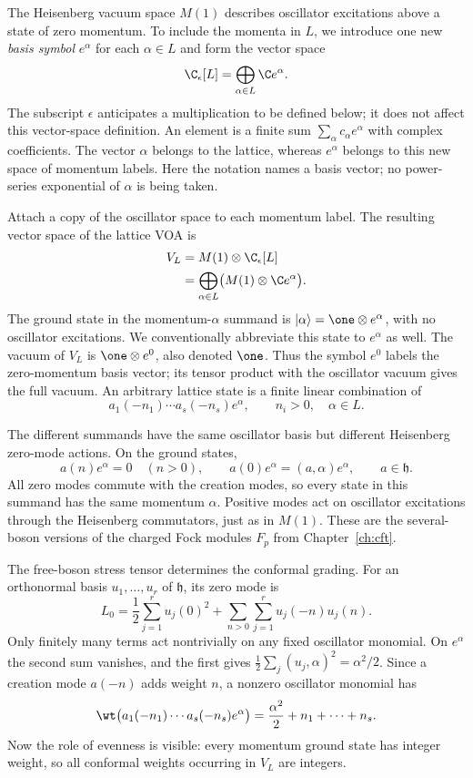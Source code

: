 The Heisenberg vacuum space $M(1)$ describes oscillator excitations
above a state of zero momentum. To include the momenta in $L$, we
introduce one new \emph{basis symbol} $e^\alpha$ for each
$\alpha\in L$ and form the vector space
\[
 \C_\epsilon[L]=\bigoplus_{\alpha\in L}\C e^\alpha.
\]
The subscript $\epsilon$ anticipates a multiplication to be defined
below; it does not affect this vector-space definition. An element
is a finite sum $\sum_\alpha c_\alpha e^\alpha$ with complex
coefficients. The vector $\alpha$ belongs to the lattice, whereas
$e^\alpha$ belongs to this new space of momentum labels. Here the
notation names a basis vector; no power-series exponential of
$\alpha$ is being taken.

Attach a copy of the oscillator space to each momentum label. The
resulting vector space of the lattice VOA is
\begin{equation}
 \begin{split}
 V_L&=M(1)\otimes\C_\epsilon[L]\\
    &=\bigoplus_{\alpha\in L}\bigl(M(1)\otimes\C e^\alpha\bigr).
 \end{split}
 \label{eq:voa-lattice-space}
\end{equation}
The ground state in the momentum-$\alpha$ summand is
$|\alpha\rangle=\one\otimes e^\alpha$, with no oscillator
excitations. We conventionally abbreviate this state to $e^\alpha$
as well. The vacuum of $V_L$ is $\one\otimes e^0$, also denoted
$\one$. Thus the symbol $e^0$ labels the zero-momentum basis vector;
its tensor product with the oscillator vacuum gives the full vacuum.
An arbitrary lattice state is a finite linear combination of
\[
 a_1(-n_1)\cdots a_s(-n_s)e^\alpha,
 \qquad n_i>0,\quad \alpha\in L.
\]

The different summands have the same oscillator basis but different
Heisenberg zero-mode actions. On the ground states,
\begin{equation}
 a(n)e^\alpha=0\quad(n>0),\qquad
 a(0)e^\alpha=(a,\alpha)e^\alpha,
 \qquad a\in\mathfrak h.
 \label{eq:voa-momentum-ground-state}
\end{equation}
All zero modes commute with the creation modes, so every state in
this summand has the same momentum $\alpha$. Positive modes act
on oscillator excitations through the Heisenberg commutators, just
as in $M(1)$. These are the several-boson versions of the charged
Fock modules $F_p$ from Chapter~\ref{ch:cft}.

The free-boson stress tensor determines the conformal grading.
For an orthonormal basis $u_1,\ldots,u_r$ of $\mathfrak h$,
its zero mode is
\[
 L_0=\frac12\sum_{j=1}^r u_j(0)^2
       +\sum_{n>0}\sum_{j=1}^r u_j(-n)u_j(n).
\]
Only finitely many terms act nontrivially on any fixed oscillator
monomial.
On $e^\alpha$ the second sum vanishes, and the first gives
$\tfrac12\sum_j(u_j,\alpha)^2=\alpha^2/2$. Since a creation
mode $a(-n)$ adds weight $n$, a nonzero oscillator monomial has
\[
 \wt\bigl(a_1(-n_1)\cdots a_s(-n_s)e^\alpha\bigr)
 =\frac{\alpha^2}{2}+n_1+\cdots+n_s.
\]
Now the role of evenness is visible: every momentum ground state has
integer weight, so all conformal weights occurring in $V_L$ are integers.

